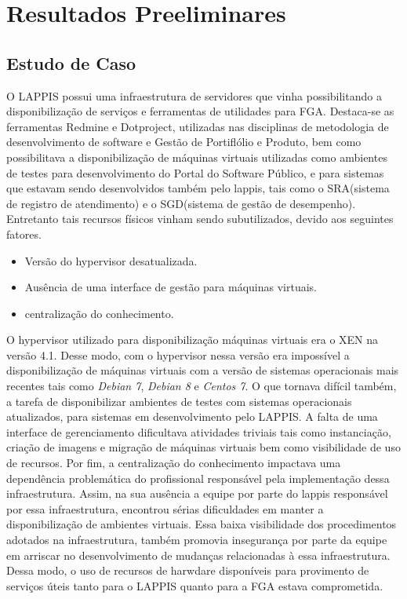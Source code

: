 \chapter{Resultados Preeliminares}
\section{Estudo de Caso}
O LAPPIS possui uma infraestrutura de servidores que vinha possibilitando a disponibilização de serviços e ferramentas de utilidades para FGA. Destaca-se as ferramentas Redmine e Dotproject, utilizadas nas disciplinas de metodologia de desenvolvimento de software e Gestão de Portiflólio e Produto, bem como possibilitava a disponibilização de máquinas virtuais utilizadas como ambientes de testes para desenvolvimento do Portal do Software Público, e para sistemas que estavam sendo desenvolvidos também pelo  lappis, tais como o SRA(sistema de registro de atendimento) e o SGD(sistema de gestão de desempenho). Entretanto tais recursos físicos vinham sendo subutilizados, devido aos seguintes fatores.
\begin{itemize}
 \item Versão do hypervisor desatualizada.
 \item Ausência de uma interface de gestão para máquinas virtuais.
 \item centralização do conhecimento.
\end{itemize}
      
      O hypervisor utilizado para disponibilização máquinas virtuais era o XEN na versão 4.1. Desse modo, com  o hypervisor nessa versão era impossível a disponibilização de máquinas virtuais com a versão de sistemas operacionais mais recentes tais como \textit{Debian 7}, \textit{Debian 8} e \textit{Centos 7}. O que tornava difícil também, a tarefa de disponibilizar ambientes de testes com sistemas operacionais atualizados, para sistemas em desenvolvimento pelo LAPPIS. A falta de uma interface de gerenciamento dificultava atividades triviais tais como instanciação, criação de imagens e migração de máquinas virtuais bem como visibilidade de uso de recursos. Por fim, a centralização do conhecimento impactava uma dependência problemática do profissional responsável pela implementação dessa infraestrutura. Assim, na sua ausência a equipe por parte do lappis responsável por essa infraestrutura, encontrou sérias dificuldades em manter a disponibilização de ambientes virtuais. Essa baixa visibilidade dos procedimentos adotados na infraestrutura, também promovia insegurança por parte da equipe em arriscar no desenvolvimento de mudanças relacionadas à essa infraestrutura. Dessa modo, o uso de recursos de harwdare disponíveis para provimento de serviços úteis tanto para o LAPPIS quanto para a FGA estava comprometida. 
      

